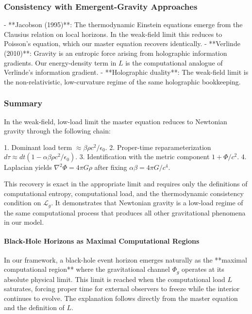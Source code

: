 \documentclass[reprint,amsmath,amssymb,aps,prd,preprintnumbers,superscriptaddress,longbibliography,10pt]{revtex4-2}
\begin{document}
\subsubsection{Consistency with Emergent-Gravity Approaches}

- **Jacobson (1995)**: The thermodynamic Einstein equations emerge from the Clausius relation on local horizons. In the weak-field limit this reduces to Poisson’s equation, which our master equation recovers identically.
- **Verlinde (2010)**: Gravity is an entropic force arising from holographic information gradients. Our energy-density term in $L$ is the computational analogue of Verlinde’s information gradient.
- **Holographic duality**: The weak-field limit is the non-relativistic, low-curvature regime of the same holographic bookkeeping.

\subsubsection{Summary}

In the weak-field, low-load limit the master equation reduces to Newtonian gravity through the following chain:

1. Dominant load term $\approx \beta \rho c^2 / \epsilon_0$.
2. Proper-time reparameterization $d\tau \approx dt (1 - \alpha \beta \rho c^2 / \epsilon_0)$.
3. Identification with the metric component $1 + \Phi/c^2$.
4. Laplacian yields $\nabla^2 \Phi = 4\pi G \rho$ after fixing $\alpha\beta = 4\pi G / c^4$.

This recovery is exact in the appropriate limit and requires only the definitions of computational entropy, computational load, and the thermodynamic consistency condition on $\mathcal{L}_g$. It demonstrates that Newtonian gravity is a low-load regime of the same computational process that produces all other gravitational phenomena in our model.

\paragraph{Black-Hole Horizons as Maximal Computational Regions}

In our framework, a black-hole event horizon emerges naturally as the **maximal computational region** where the gravitational channel $\Phi_g$ operates at its absolute physical limit. This limit is reached when the computational load $L$ saturates, forcing proper time for external observers to freeze while the interior continues to evolve. The explanation follows directly from the master equation and the definition of $L$.
\end{document}
